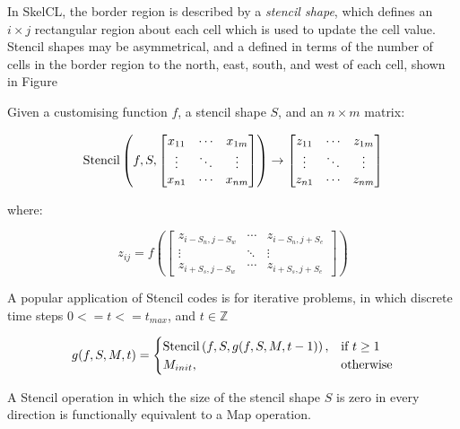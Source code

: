 In SkelCL, the border region is described by a \emph{stencil shape},
which defines an $i \times j$ rectangular region about each cell which
is used to update the cell value. Stencil shapes may be asymmetrical,
and a defined in terms of the number of cells in the border region to
the north, east, south, and west of each cell, shown in
Figure~

Given a customising function $f$, a stencil shape $S$, and an
$n \times m$ matrix:

\begin{equation}
\operatorname*{Stencil} \left( f, S,
\begin{bmatrix}
  x_{11} & \cdots & x_{1m} \\
  \vdots & \ddots & \vdots \\
  x_{n1} & \cdots & x_{nm}
\end{bmatrix} \right)
\to
\begin{bmatrix}
  z_{11} & \cdots & z_{1m} \\
  \vdots & \ddots & \vdots \\
  z_{n1} & \cdots & z_{nm}
\end{bmatrix}
\end{equation}

where:

\begin{equation}
z_{ij} = f \left(
\begin{bmatrix}
  z_{i-S_n,j-S_w} & \cdots & z_{i-S_n,j+S_e} \\
  \vdots & \ddots & \vdots \\
  z_{i+S_s,j-S_w} & \cdots & z_{i+S_s,j+S_e}
\end{bmatrix} \right)
\end{equation}

A popular application of Stencil codes is for iterative problems, in
which \todo{\ldots} discrete time steps $0 <= t <= t_{max}$, and
$t \in \mathbb{Z}$

\begin{equation}
g(f, S, M, t) =
\begin{cases}
  \operatorname*{Stencil} \left( f, S, g(f, S, M, t-1) \right),& \text{if } t \geq 1\\
  M_{init}, & \text{otherwise}
\end{cases}
\end{equation}

A Stencil operation in which the size of the stencil shape $S$ is zero
in every direction is functionally equivalent to a Map operation.

